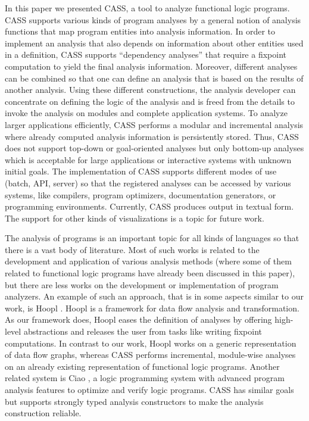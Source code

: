 \documentclass{llncs}
\begin{document}
In this paper we presented CASS, a tool to analyze functional logic programs.
CASS supports various kinds of program analyses
by a general notion of analysis functions that map
program entities into analysis information.
In order to implement an analysis that also depends on information
about other entities used in a definition, CASS supports
``dependency analyses'' that require a fixpoint computation
to yield the final analysis information.
Moreover, different analyses can be combined so that
one can define an analysis that is based on the results of another analysis.
Using these different constructions,
the analysis developer can concentrate on defining the logic
of the analysis and is freed from the details to invoke
the analysis on modules and complete application systems.
To analyze larger applications efficiently,
CASS performs a modular and incremental analysis
where already computed analysis information is persistently stored.
Thus, CASS does not support top-down or goal-oriented analyses
but only bottom-up analyses which is acceptable for large applications
or interactive systems with unknown initial goals.
The implementation of CASS supports different modes of use
(batch, API, server) so that the registered analyses
can be accessed by various systems, like compilers, program optimizers,
documentation generators, or programming environments.
Currently, CASS produces output in textual form.
The support for other kinds of visualizations is a topic for future work.

The analysis of programs is an important topic for all kinds
of languages so that there is a vast body of literature.
Most of such works is related to the development and application
of various analysis methods (where some of them related
to functional logic programs have already been discussed
in this paper), but there are less works on the development
or implementation of program analyzers.
An example of such an approach, that is in some aspects
similar to our work, is Hoopl \cite{RamseyDiasPeytonJones10}.
Hoopl is a framework for data flow analysis and transformation.
As our framework does, Hoopl eases the definition of
analyses by offering high-level abstractions and
releases the user from tasks like writing fixpoint computations.
In contrast to our work, Hoopl works on a generic representation
of data flow graphs, whereas CASS performs 
incremental, module-wise analyses on an already existing
representation of functional logic programs. 
Another related system is Ciao \cite{HermenegildoEtAl12},
a logic programming system with advanced program analysis features
to optimize and verify logic programs.
CASS has similar goals but supports strongly typed analysis constructors
to make the analysis construction reliable.
\end{document}
